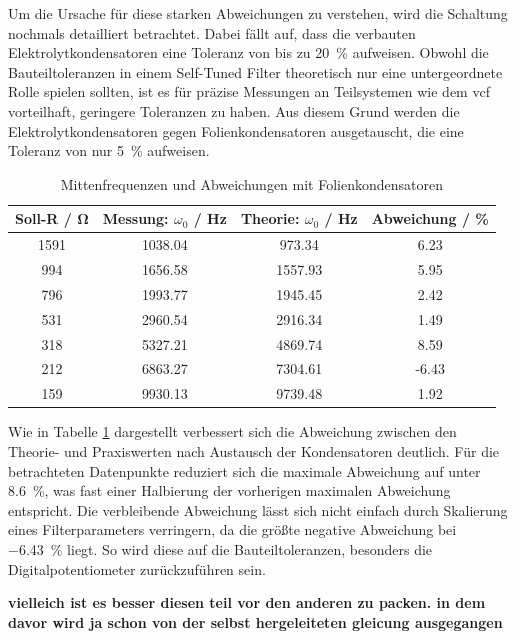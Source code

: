 \documentclass[../main_config.tex]{subfiles}
\begin{document}
Um die Ursache für diese starken Abweichungen zu verstehen, wird die Schaltung nochmals detailliert betrachtet. Dabei fällt auf, dass die verbauten Elektrolytkondensatoren eine Toleranz von bis zu \SI{20}{\percent} aufweisen. Obwohl die Bauteiltoleranzen in einem Self-Tuned Filter theoretisch nur eine untergeordnete  Rolle spielen sollten, ist es für präzise Messungen an Teilsystemen wie dem \gls{vcf} vorteilhaft, geringere Toleranzen zu haben. Aus diesem Grund werden die Elektrolytkondensatoren gegen Folienkondensatoren ausgetauscht, die eine Toleranz von nur \SI{5}{\percent} aufweisen.\par
\medskip

\begin{table}[h]
    \centering
    \begin{tabular}{c|c|c|c}
        \textbf{Soll-R / \si{\ohm}} & \textbf{Messung: $\omega_0$ / \si{\hertz}} & \textbf{Theorie: $\omega_0$ / \si{\hertz}} & \textbf{Abweichung / \%} \\ \hline
        1591 & 1038.04 & 973.34 & 6.23 \\
        994 & 1656.58 & 1557.93 & 5.95 \\
        796 & 1993.77 & 1945.45 & 2.42 \\
        531 & 2960.54 & 2916.34 & 1.49 \\
        318 & 5327.21 & 4869.74 & 8.59 \\
        212 & 6863.27 & 7304.61 & -6.43 \\
        159 & 9930.13 & 9739.48 & 1.92 \\
    \end{tabular}
    \caption{Mittenfrequenzen und Abweichungen mit Folienkondensatoren}
    \label{tab:mittenfrequenzen2}
\end{table}

Wie in Tabelle \ref{tab:mittenfrequenzen2} dargestellt verbessert sich die Abweichung zwischen den Theorie- und Praxiswerten nach Austausch der Kondensatoren deutlich. Für die betrachteten Datenpunkte reduziert sich die maximale Abweichung auf unter \SI{8.6}{\percent}, was fast einer Halbierung der vorherigen maximalen Abweichung entspricht. Die verbleibende Abweichung lässt sich nicht einfach durch Skalierung eines Filterparameters verringern, da die größte negative Abweichung bei \SI{-6.43}{\percent} liegt. So wird diese auf die Bauteiltoleranzen, besonders die Digitalpotentiometer zurückzuführen sein. \par
\medskip


\textbf{vielleich ist es besser diesen teil vor den anderen zu packen. in dem davor wird ja schon von der selbst hergeleiteten gleicung ausgegangen}
\end{document}
